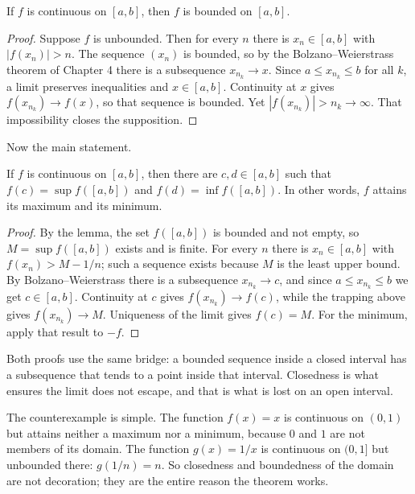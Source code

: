 \begin{lemma}
If $f$ is continuous on $[a,b]$, then $f$ is bounded on $[a,b]$.
\end{lemma}

\begin{proof}
Suppose $f$ is unbounded. Then for every $n$ there is $x_{n}\in[a,b]$ with
$|f(x_{n})|>n$. The sequence $(x_{n})$ is bounded, so by the
Bolzano--Weierstrass theorem of Chapter 4 there is a subsequence $x_{n_{k}}\to x$. Since
$a\le x_{n_{k}}\le b$ for all $k$, a limit preserves inequalities and
$x\in[a,b]$. Continuity at $x$ gives $f(x_{n_{k}})\to f(x)$, so that sequence is
bounded. Yet $|f(x_{n_{k}})|>n_{k}\to\infty$. That impossibility closes the
supposition.
\end{proof}

Now the main statement.

\begin{teorema}
If $f$ is continuous on $[a,b]$, then there are $c,d\in[a,b]$ such that
$f(c)=\sup f([a,b])$ and $f(d)=\inf f([a,b])$. In other words, $f$ attains its
maximum and its minimum.
\end{teorema}

\begin{proof}
By the lemma, the set $f([a,b])$ is bounded and not empty, so $M=\sup f([a,b])$
exists and is finite. For every $n$ there is $x_{n}\in[a,b]$ with $f(x_{n})>M-1/n$;
such a sequence exists because $M$ is the least upper bound. By
Bolzano--Weierstrass there is a subsequence $x_{n_{k}}\to c$, and since
$a\le x_{n_{k}}\le b$ we get $c\in[a,b]$. Continuity at $c$ gives
$f(x_{n_{k}})\to f(c)$, while the trapping above gives $f(x_{n_{k}})\to M$.
Uniqueness of the limit gives $f(c)=M$. For the minimum, apply that result to $-f$.
\end{proof}

Both proofs use the same bridge: a bounded sequence inside a closed interval has a
subsequence that tends to a point inside that interval. Closedness is what ensures the
limit does not escape, and that is what is lost on an open interval.

The counterexample is simple. The function $f(x)=x$ is continuous on $(0,1)$ but attains
neither a maximum nor a minimum, because $0$ and $1$ are not members of its domain. The
function $g(x)=1/x$ is continuous on $(0,1]$ but unbounded there: $g(1/n)=n$. So
closedness and boundedness of the domain are not decoration; they are the entire reason
the theorem works.

